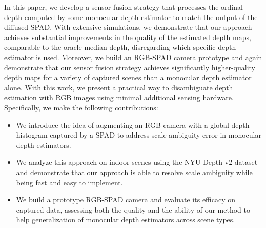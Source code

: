 In this paper, we develop a sensor fusion strategy that processes the ordinal depth computed by some monocular depth estimator to match the output of the diffused SPAD. With extensive simulations, we demonstrate that our approach achieves substantial improvements in the quality of the estimated depth maps, comparable to the oracle median depth, disregarding which specific depth estimator is used. Moreover, we build an RGB-SPAD camera prototype and again demonstrate that our sensor fusion strategy achieves significantly higher-quality depth maps for a variety of captured scenes than a monocular depth estimator alone. With this work, we present a practical way to disambiguate depth estimation with RGB images using minimal additional sensing hardware. Specifically, we make the following contributions:
%
\begin{itemize}
	\item We introduce the idea of augmenting an RGB camera with a global depth histogram captured by a SPAD to address scale ambiguity error in monocular depth estimators.	
  \item We analyze this approach on indoor scenes using the NYU Depth v2 dataset and demonstrate that our approach is able to resolve scale ambiguity while being fast and easy to implement.
	\item We build a prototype RGB-SPAD camera and evaluate its efficacy on captured data, assessing both the quality and the ability of our method to help generalization of monocular depth estimators across scene types. 
\end{itemize}


